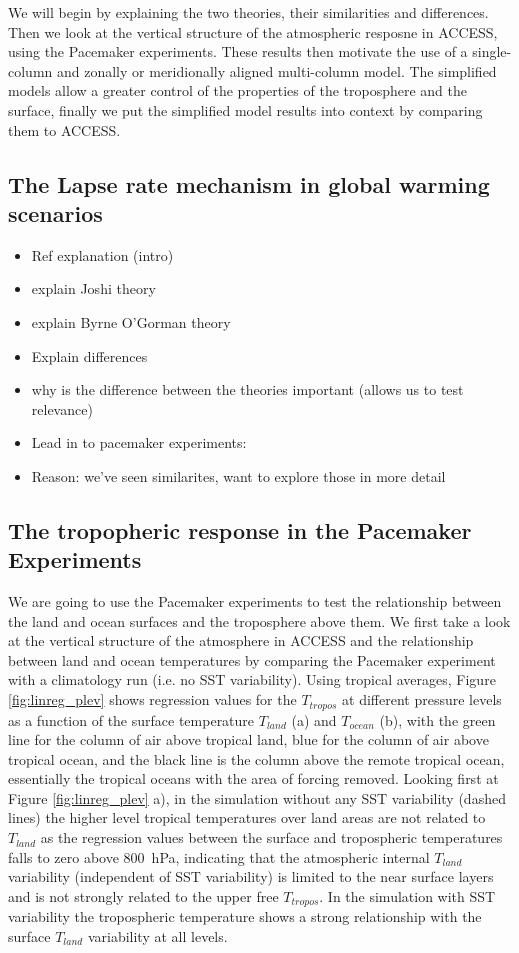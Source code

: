 We will begin by explaining the two theories, their similarities and 
differences. Then we look at the vertical structure of the atmospheric resposne 
in ACCESS, using the Pacemaker experiments. These results then motivate the use 
of a single-column and zonally or meridionally aligned multi-column model. The 
simplified models allow a greater control of the properties of the troposphere 
and the surface, finally we put the simplified model results into context by 
comparing them to ACCESS.

\subsection{The Lapse rate mechanism in global warming scenarios}

\begin{itemize}
	\item Ref explanation (intro)
	\item explain Joshi theory
	\item explain Byrne O'Gorman theory
	\item Explain differences
	\item why is the difference between the theories important (allows us to 
		test relevance)
	\item Lead in to pacemaker experiments:
	\item Reason: we've seen similarites, want to explore those in more detail
\end{itemize}


\subsection{The tropopheric response in the Pacemaker Experiments}

We are going to use the Pacemaker experiments to test the relationship between 
the land and ocean surfaces and the troposphere above them. We first take a look 
at the vertical structure of the atmosphere in ACCESS and the relationship 
between land and ocean temperatures by comparing the Pacemaker experiment with a 
climatology run (i.e. no SST variability).  Using tropical averages, Figure 
\ref{fig:linreg_plev} shows regression values for the $T_{tropos}$ at different 
pressure levels as a function of the surface temperature $T_{land}$ (a) and 
$T_{ocean}$ (b), with the green line for the column of air above tropical land, 
blue for the column of air above tropical ocean, and the black line is the 
column above the remote tropical ocean, essentially the tropical oceans with the 
area of forcing removed.  Looking first at Figure \ref{fig:linreg_plev} a), in 
the simulation without any SST variability (dashed lines) the higher level 
tropical temperatures over land areas are not related to $T_{land}$ as the 
regression values between the surface and tropospheric temperatures falls to 
zero above \SI{800}{\hecto\pascal}, indicating that the atmospheric internal 
$T_{land}$ variability (independent of SST variability) is limited to the near 
surface layers and is not strongly related to the upper free $T_{tropos}$. In 
the simulation with SST variability the tropospheric temperature shows a strong 
relationship with the surface $T_{land}$ variability at all levels. 

